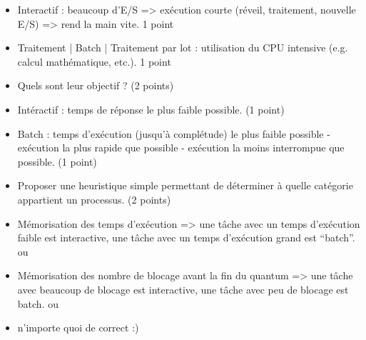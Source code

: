 \begin{correction}

\begin{itemize}
  \item Interactif : beaucoup d'E/S => ex\'ecution courte (r\'eveil, traitement, nouvelle E/S) => rend la main vite.  1 point
  \item Traitement | Batch | Traitement par lot : utilisation du CPU intensive (e.g. calcul math\'ematique, etc.). 1 point
\end{itemize}

\end{correction}

\begin{itemize}
  \item Quels sont leur objectif ? (2 points)
\end{itemize}

\begin{correction}

\begin{itemize}
  \item Int\'eractif : temps de r\'eponse le plus faible possible. (1 point)
  \item Batch : temps d'ex\'ecution (jusqu'\`a compl\'etude) le plus faible possible - ex\'ecution la plus rapide que possible - ex\'ecution la moins interrompue que possible. (1 point)
\end{itemize}

\end{correction}

\begin{itemize}
  \item Proposer une heuristique simple permettant de d\'eterminer \`a quelle cat\'egorie appartient un processus. (2 points)
\end{itemize}

\begin{correction}

\begin{itemize}
\item M\'emorisation des temps d'ex\'ecution => une t\^ache avec un temps d'ex\'ecution faible est interactive, une t\^ache avec un temps d'ex\'ecution grand est “batch”.
ou
\item M\'emorisation des nombre de blocage avant la fin du quantum => une t\^ache avec beaucoup de blocage est interactive, une t\^ache avec peu de blocage est batch.
ou
\item n'importe quoi de correct :)
\end{itemize}

\end{correction}

